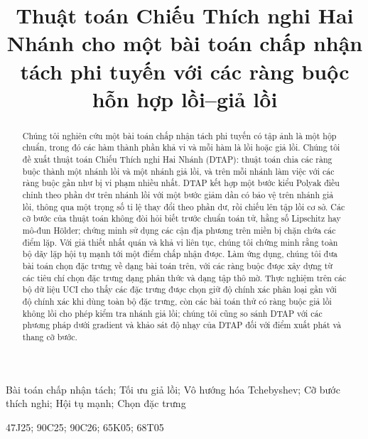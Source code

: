 

\title{Thuật toán Chiếu Thích nghi Hai Nhánh cho một bài toán chấp nhận tách phi tuyến với các ràng buộc hỗn hợp lồi--giả lồi}

\author{
}

\maketitle

\begin{abstract}
Chúng tôi nghiên cứu một bài toán chấp nhận tách phi tuyến có tập ảnh là một hộp chuẩn, trong đó các hàm thành phần khả vi và mỗi hàm là lồi hoặc giả lồi. Chúng tôi đề xuất thuật toán Chiếu Thích nghi Hai Nhánh (DTAP): thuật toán chia các ràng buộc thành một nhánh lồi và một nhánh giả lồi, và trên mỗi nhánh làm việc với các ràng buộc gần như bị vi phạm nhiều nhất. DTAP kết hợp một bước kiểu Polyak điều chỉnh theo phần dư trên nhánh lồi với một bước giảm dần có bảo vệ trên nhánh giả lồi, thông qua một trọng số tỉ lệ thay đổi theo phần dư, rồi chiếu lên tập lồi cơ sở. Các cỡ bước của thuật toán không đòi hỏi biết trước chuẩn toán tử, hằng số Lipschitz hay mô-đun H\"older; chứng minh sử dụng các cận địa phương trên miền bị chặn chứa các điểm lặp. Với giả thiết nhất quán và khả vi liên tục, chúng tôi chứng minh rằng toàn bộ dãy lặp hội tụ mạnh tới một điểm chấp nhận được. Làm ứng dụng, chúng tôi đưa bài toán chọn đặc trưng về dạng bài toán trên, với các ràng buộc được xây dựng từ các tiêu chí chọn đặc trưng dạng phân thức và dạng tập thô mờ. Thực nghiệm trên các bộ dữ liệu UCI cho thấy các đặc trưng được chọn giữ độ chính xác phân loại gần với độ chính xác khi dùng toàn bộ đặc trưng, còn các bài toán thử có ràng buộc giả lồi không lồi cho phép kiểm tra nhánh giả lồi; chúng tôi cũng so sánh DTAP với các phương pháp dưới gradient và khảo sát độ nhạy của DTAP đối với điểm xuất phát và thang cỡ bước.
\end{abstract}

\begin{keywords}
Bài toán chấp nhận tách; Tối ưu giả lồi; Vô hướng hóa Tchebyshev; Cỡ bước thích nghi; Hội tụ mạnh; Chọn đặc trưng
\end{keywords}
\begin{amscode}
47J25; 90C25; 90C26; 65K05; 68T05
\end{amscode}


